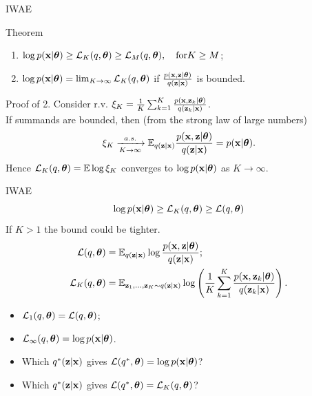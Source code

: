 \begin{frame}{IWAE}
	\begin{block}{Theorem}
		\begin{enumerate}
			\item $\log p(\mathbf{x} | \boldsymbol{\theta}) \geq \mathcal{L}_K (q, \boldsymbol{\theta}) \geq \mathcal{L}_M (q, \boldsymbol{\theta}), \quad \text{for} K \geq M$;
			\item $\log p(\mathbf{x} | \boldsymbol{\theta}) = \lim_{K \rightarrow \infty} \mathcal{L}_K (q, \boldsymbol{\theta})$ if $\frac{p(\mathbf{x}, \mathbf{z} | \boldsymbol{\theta})}{q(\mathbf{z} | \mathbf{x})}$ is bounded.
		\end{enumerate}
		\vspace{-0.2cm}
	\end{block}
	\begin{block}{Proof of 2.}
		\vspace{0.2cm}
		Consider r.v. $\xi_K = \frac{1}{K}\sum_{k=1}^K \frac{p(\mathbf{x}, \mathbf{z}_k | \boldsymbol{\theta})}{q(\mathbf{z}_k | \mathbf{x})}$. \\
		\vspace{0.2cm}
		If summands are bounded, then (from the strong law of large numbers)
		\[
		\xi_K \xrightarrow[K \rightarrow \infty]{a.s.} \mathbb{E}_{q(\mathbf{z} | \mathbf{x})} \frac{p(\mathbf{x}, \mathbf{z} | \boldsymbol{\theta})}{q(\mathbf{z} | \mathbf{x})} = p(\mathbf{x} | \boldsymbol{\theta}).
		\]
		Hence $\mathcal{L}_K (q, \boldsymbol{\theta}) = \mathbb{E} \log \xi_K$ converges to $\log p(\mathbf{x} | \boldsymbol{\theta})$ as $K \rightarrow \infty$.
	\end{block}

\end{frame}
\begin{frame}{IWAE}
	\[
	\log p(\mathbf{x} | \boldsymbol{\theta}) \geq \mathcal{L}_K(q, \boldsymbol{\theta}) \geq \mathcal{L}(q, \boldsymbol{\theta})
	\]
	If $K > 1$ the bound could be tighter.
	\begin{align*}
		\mathcal{L} (q, \boldsymbol{\theta}) &= \mathbb{E}_{q(\mathbf{z} | \mathbf{x})} \log \frac{p(\mathbf{x}, \mathbf{z} | \boldsymbol{\theta})}{q(\mathbf{z}| \mathbf{x})}; \\
		\mathcal{L}_K (q, \boldsymbol{\theta}) &= \mathbb{E}_{\mathbf{z}_1, \dots, \mathbf{z}_K \sim q(\mathbf{z} | \mathbf{x})} \log \left( \frac{1}{K}\sum_{k=1}^K\frac{p(\mathbf{x}, \mathbf{z}_k | \boldsymbol{\theta})}{q(\mathbf{z}_k| \mathbf{x})} \right).
	\end{align*}
	\vspace{-0.2cm}
	\begin{itemize}
		\item $\mathcal{L}_1(q, \boldsymbol{\theta}) = \mathcal{L}(q, \boldsymbol{\theta})$;
		\item $\mathcal{L}_{\infty}(q, \boldsymbol{\theta}) = \log p(\mathbf{x} | \boldsymbol{\theta})$.
		\item Which $q^*(\mathbf{z} | \mathbf{x})$ gives $\mathcal{L}(q^*, \boldsymbol{\theta}) = \log p(\mathbf{x} | \boldsymbol{\theta})$? 
		\item Which $q^*(\mathbf{z} | \mathbf{x})$ gives $\mathcal{L}(q^*, \boldsymbol{\theta}) = \mathcal{L}_K(q, \boldsymbol{\theta})$?
	\end{itemize}

\end{frame}
